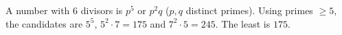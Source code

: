 A number with $6$ divisors is $p^5$ or $p^2q$ ($p,q$ distinct primes). Using primes $\ge5$, the candidates are $5^5$, $5^2\cdot7=175$ and $7^2\cdot5=245$. The least is $\boxed{175}$.
